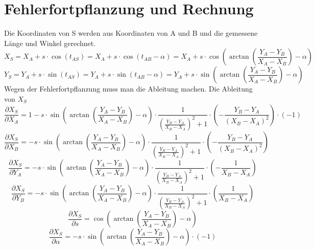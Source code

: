 \documentclass[12pt]{article}
\begin{document}
\section{Fehlerfortpflanzung und Rechnung}
Die Koordinaten von S werden aus Koordinaten von A und B und die gemessene Länge und Winkel gerechnet. 
\begin{equation}
X_S = X_A + s \cdot \cos (t_{AS}) = X_A + s \cdot \cos(t_{AB} - \alpha) = X_A + s \cdot \cos(\arctan(\frac{Y_A - Y_B}{X_A - X_B}) - \alpha)
\end{equation}
\begin{equation}
Y_S = Y_A + s \cdot \sin (t_{AS}) = Y_A + s \cdot \sin(t_{AB} - \alpha) = Y_A + s \cdot \sin(\arctan(\frac{Y_A - Y_B}{X_A - X_B}) - \alpha)
\end{equation}
Wegen der Fehlerfortpflanzung muss man die Ableitung machen. 
\newline
Die Ableitung von $X_S$
\newline
\begin{equation}
\frac{\partial X_S}{\partial X_A} = 1 - s \cdot \sin (\arctan(\frac{Y_A - Y_B}{X_A - X_B}) - \alpha) \cdot \frac{1}{(\frac{Y_B - Y_A}{X_B - X_A})^2 + 1} \cdot (-\frac{Y_B - Y_A}{(X_B - X_A)^2}) \cdot (-1)
\end{equation}
\begin{equation}
\frac{\partial X_S}{\partial X_B} = -s \cdot \sin (\arctan(\frac{Y_A - Y_B}{X_A - X_B}) - \alpha) \cdot \frac{1}{(\frac{Y_B - Y_A}{X_B - X_A})^2 + 1} \cdot (-\frac{Y_B - Y_A}{(X_B - X_A)^2}) 
\end{equation}
\begin{equation}
\frac{\partial X_S}{\partial Y_A} = -s \cdot \sin (\arctan(\frac{Y_A - Y_B}{X_A - X_B}) - \alpha) \cdot \frac{1}{(\frac{Y_B - Y_A}{X_B - X_A})^2 + 1} \cdot (- \frac{1}{X_B - X_A})
\end{equation}
\begin{equation}
\frac{\partial X_S}{\partial Y_B} = -s \cdot \sin (\arctan(\frac{Y_A - Y_B}{X_A - X_B}) - \alpha) \cdot \frac{1}{(\frac{Y_B - Y_A}{X_B - X_A})^2 + 1} \cdot (\frac{1}{X_B - X_A})
\end{equation}
\begin{equation}
\frac{\partial X_S}{\partial s} = \cos(\arctan(\frac{Y_A - Y_B}{X_A - X_B}) - \alpha)
\end{equation}
\begin{equation}
\frac{\partial X_S}{\partial \alpha} = -s \cdot \sin(\arctan(\frac{Y_A - Y_B}{X_A - X_B}) - \alpha) \cdot (-1)
\end{equation}
\end{document}
